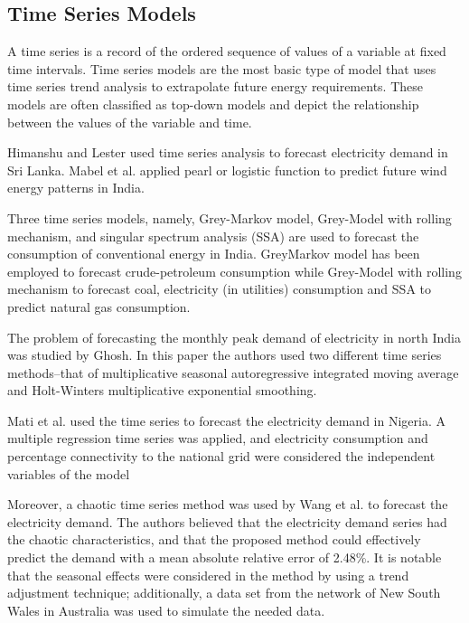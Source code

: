\documentclass[lettersize,journal]{IEEEtran}
\begin{document}
  \subsection{Time Series Models}

  A time series is a record of the ordered sequence of values of a variable at fixed time intervals. Time series models are the most basic type of model that uses time series trend analysis to extrapolate future energy requirements. These models are often classified as top-down models and depict the relationship between the values of the variable and time.

  Himanshu and Lester used time series analysis to forecast electricity demand in Sri Lanka\cite{srilanka}. Mabel et al. applied pearl or logistic function to predict future wind energy patterns in India\cite{TSA-india}.

Three time series models, namely, Grey-Markov model, Grey-Model with rolling mechanism, and singular spectrum analysis (SSA) are used to forecast the consumption of conventional energy in India. GreyMarkov model has been employed to forecast crude-petroleum consumption while Grey-Model with rolling mechanism to forecast coal, electricity (in utilities) consumption and SSA to predict natural gas consumption\cite{time-serie india}.

The problem of forecasting the monthly peak demand of electricity in north India was studied by Ghosh\cite{time-serie india ghosh}. In this paper the authors used two different time series methods–that of multiplicative seasonal autoregressive integrated moving average and Holt-Winters multiplicative exponential smoothing. 

Mati et al.\cite{time-serie Nigeria} used the time series to forecast the electricity demand in Nigeria. A multiple regression time series was applied, and electricity consumption and percentage connectivity to the national grid were considered the independent variables of the model

Moreover, a chaotic time series method was used by Wang et al.\cite{time-serie china} to forecast the electricity demand. The authors believed that the electricity demand series had the chaotic characteristics, and that the proposed method could effectively predict the demand with a mean absolute relative error of 2.48\%. It is notable that the seasonal effects were considered in the method by using a trend adjustment technique; additionally, a data set from the network of New South Wales in Australia was used to simulate the needed data.
\end{document}

